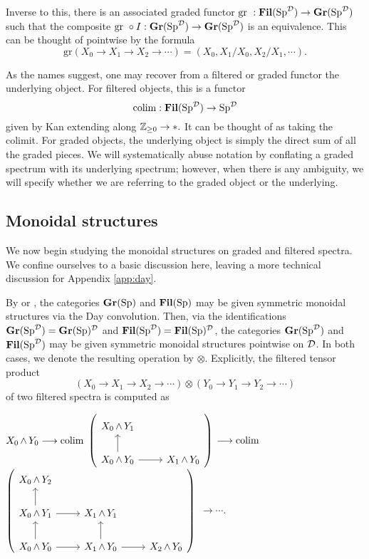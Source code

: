 Inverse to this, there is an associated graded functor $\text{gr }: \operatorname{\mathbf{Fil}}(\operatorname{\mathrm{Sp}}^{\operatorname{\mathcal{D}}}) \to \operatorname{\mathbf{Gr}}(\operatorname{\mathrm{Sp}}^{\operatorname{\mathcal{D}}})$ such that the composite $\text{gr }\circ I : \operatorname{\mathbf{Gr}}(\operatorname{\mathrm{Sp}}^{\operatorname{\mathcal{D}}}) \to \operatorname{\mathbf{Gr}}(\operatorname{\mathrm{Sp}}^{\operatorname{\mathcal{D}}})$ is an equivalence.   This can be thought of pointwise by the formula $$\text{gr}(X_0\to X_1\to X_2\to \cdots) = (X_0, X_1/X_0, X_2/X_1, \cdots).$$

As the names suggest, one may recover from a filtered or graded functor the underlying object.  For filtered objects, this is a functor $$\operatorname*{\mathrm{colim}} : \operatorname{\mathbf{Fil}}(\operatorname{\mathrm{Sp}}^{\operatorname{\mathcal{D}}}) \to \operatorname{\mathrm{Sp}}^{\operatorname{\mathcal{D}}}$$ given by Kan extending along $\operatorname{\mathbb{Z}}_{\geq 0}\to *.$   It can be thought of as taking the colimit.  For graded objects, the underlying object is simply the direct sum of all the graded pieces. We will systematically abuse notation by conflating a graded spectrum with its underlying spectrum; however, when there is any ambiguity, we will specify whether we are referring to the graded object or the underlying.




\subsection{Monoidal structures}\label{sect:monoidal}
We now begin studying the monoidal structures on graded and filtered spectra.  We confine ourselves to a basic discussion here, leaving a more technical discussion for Appendix \ref{app:day}.

By \cite{Glasman} or \cite[Example 2.2.6.17]{HA}, the categories $\operatorname{\mathbf{Gr}}(\operatorname{\mathrm{Sp}})$ and $\operatorname{\mathbf{Fil}}(\operatorname{\mathrm{Sp}})$ may be given symmetric monoidal structures via the Day convolution.  Then, via the identifications $\operatorname{\mathbf{Gr}}(\operatorname{\mathrm{Sp}}^{\operatorname{\mathcal{D}}}) = \operatorname{\mathbf{Gr}}(\operatorname{\mathrm{Sp}})^{\operatorname{\mathcal{D}}}$ and $\operatorname{\mathbf{Fil}}(\operatorname{\mathrm{Sp}}^{\operatorname{\mathcal{D}}}) = \operatorname{\mathbf{Fil}}(\operatorname{\mathrm{Sp}})^{\operatorname{\mathcal{D}}}$, the categories $\operatorname{\mathbf{Gr}}(\operatorname{\mathrm{Sp}}^{\operatorname{\mathcal{D}}})$ and $\operatorname{\mathbf{Fil}}(\operatorname{\mathrm{Sp}}^{\operatorname{\mathcal{D}}})$ may be given symmetric monoidal structures pointwise on $\operatorname{\mathcal{D}}$.  In both cases, we denote the resulting operation by $\otimes$. Explicitly, the filtered tensor product $$\left(X_0 \longrightarrow X_1 \longrightarrow X_2 \longrightarrow \cdots \right) \otimes \left(Y_0 \longrightarrow Y_1 \longrightarrow Y_2 \longrightarrow \cdots \right)$$
of two filtered spectra is computed as

\begin{center}
$X_0 \operatorname{\wedge} Y_0 \longrightarrow \operatorname*{\mathrm{colim}} $
{$ \left(\begin{tikzcd} X_0 \smsh Y_1 \\  X_0 \smsh Y_0 \arrow{u} \arrow{r} & X_1 \smsh Y_0 \end{tikzcd} \right) $} 
$\longrightarrow \operatorname*{\mathrm{colim}}$
 {$ \left( \begin{tikzcd} X_0 \smsh Y_2 \\ X_0 \smsh Y_1 \arrow{r} \arrow{u} & X_1 \smsh Y_1  \\ X_0 \smsh Y_0 \arrow{r} \arrow{u} & X_1 \smsh Y_0 \arrow{u} \arrow{r} & X_2 \smsh Y_0 \end{tikzcd} \right) $}
$\longrightarrow \cdots.$
\end{center}

